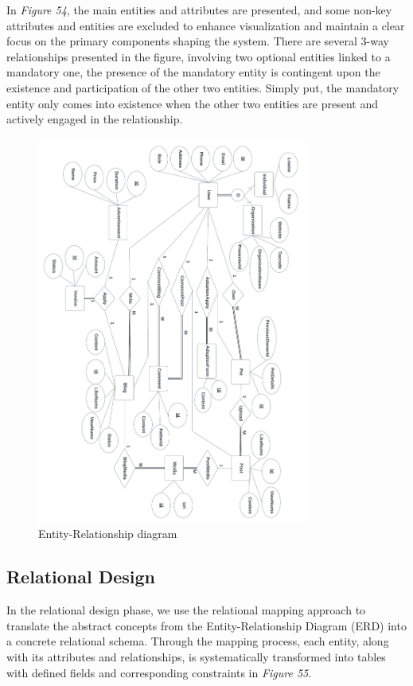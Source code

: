 In \emph{Figure 54}, the main entities and attributes are presented, and
some non-key attributes and entities are excluded to enhance
visualization and maintain a clear focus on the primary components
shaping the system. There are several 3-way relationships presented in
the figure, involving two optional entities linked to a mandatory one,
the presence of the mandatory entity is contingent upon the existence
and participation of the other two entities. Simply put, the mandatory
entity only comes into existence when the other two entities are present
and actively engaged in the relationship.

\begin{figure}[H]
    \centering
    \includegraphics[width=0.8\textwidth]{Figures/erd.png}
    \caption{Entity-Relationship diagram}
\end{figure}
\clearpage

\subsection{Relational Design}

In the relational design phase, we use the relational mapping approach
to translate the abstract concepts from the Entity-Relationship Diagram
(ERD) into a concrete relational schema. Through the mapping process,
each entity, along with its attributes and relationships, is
systematically transformed into tables with defined fields and
corresponding constraints in \emph{Figure 55}.

